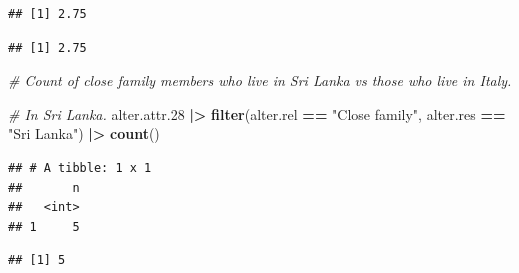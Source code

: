 \documentclass[
]{book}
\newenvironment{Shaded}{\begin{snugshade}}{\end{snugshade}}
\newcommand{\CommentTok}[1]{\textcolor[rgb]{0.56,0.35,0.01}{\textit{#1}}}
\newcommand{\FloatTok}[1]{\textcolor[rgb]{0.00,0.00,0.81}{#1}}
\newcommand{\FunctionTok}[1]{\textcolor[rgb]{0.13,0.29,0.53}{\textbf{#1}}}
\newcommand{\NormalTok}[1]{#1}
\newcommand{\SpecialCharTok}[1]{\textcolor[rgb]{0.81,0.36,0.00}{\textbf{#1}}}
\newcommand{\StringTok}[1]{\textcolor[rgb]{0.31,0.60,0.02}{#1}}
\begin{document}
\begin{verbatim}
## [1] 2.75
\end{verbatim}

\begin{Shaded}
\end{Shaded}

\begin{verbatim}
## [1] 2.75
\end{verbatim}

\begin{Shaded}
\begin{Highlighting}[]
\CommentTok{\# Count of close family members who live in Sri Lanka vs those who live in Italy.}

\CommentTok{\# In Sri Lanka.}
\NormalTok{alter.attr}\FloatTok{.28} \SpecialCharTok{|\textgreater{}}
  \FunctionTok{filter}\NormalTok{(alter.rel }\SpecialCharTok{==} \StringTok{"Close family"}\NormalTok{, alter.res }\SpecialCharTok{==} \StringTok{"Sri Lanka"}\NormalTok{) }\SpecialCharTok{|\textgreater{}} 
  \FunctionTok{count}\NormalTok{()}
\end{Highlighting}
\end{Shaded}

\begin{verbatim}
## # A tibble: 1 x 1
##       n
##   <int>
## 1     5
\end{verbatim}

\begin{Shaded}
\end{Shaded}

\begin{verbatim}
## [1] 5
\end{verbatim}
\end{document}
